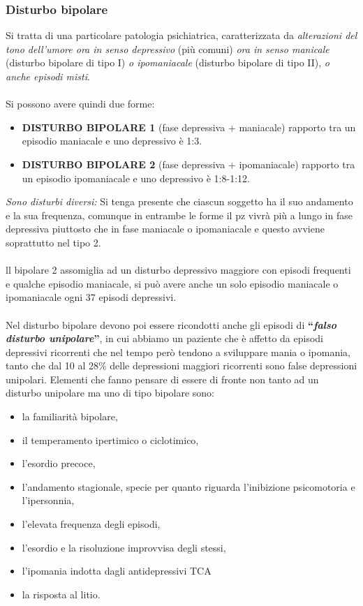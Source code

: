 \subsubsection{Disturbo bipolare}

Si tratta di una particolare patologia psichiatrica, caratterizzata da
\emph{alterazioni del tono dell'umore ora in senso depressivo} (più
comuni) \emph{ora in senso manicale} (disturbo bipolare di tipo I)
\emph{o ipomaniacale} (disturbo bipolare di tipo II), \emph{o anche
episodi misti}.
\\\\
Si possono avere quindi due forme:

\begin{itemize}
\item
  \textbf{DISTURBO BIPOLARE 1} (fase depressiva + maniacale) rapporto
  tra un episodio maniacale e uno depressivo è 1:3.
\item
  \textbf{DISTURBO BIPOLARE 2} (fase depressiva + ipomaniacale) rapporto
  tra un episodio ipomaniacale e uno depressivo è 1:8-1:12.
\end{itemize}

\emph{Sono disturbi diversi:} Si tenga presente che ciascun soggetto ha
il suo andamento e la sua frequenza, comunque in entrambe le forme il pz
vivrà più a lungo in fase depressiva piuttosto che in fase maniacale o
ipomaniacale e questo avviene soprattutto nel tipo 2.
\\\\
ll bipolare 2 assomiglia ad un disturbo depressivo maggiore con episodi
frequenti e qualche episodio maniacale, si può avere anche un solo
episodio maniacale o ipomaniacale ogni 37 episodi depressivi.
\\\\
Nel disturbo bipolare devono poi essere ricondotti anche gli episodi di
\textbf{``\emph{falso disturbo unipolare}''}, in cui abbiamo un paziente
che è affetto da episodi depressivi ricorrenti che nel tempo però
tendono a sviluppare mania o ipomania, tanto che dal 10 al 28\% delle
depressioni maggiori ricorrenti sono false depressioni unipolari.
Elementi che fanno pensare di essere di fronte non tanto ad un disturbo
unipolare ma uno di tipo bipolare sono:

\begin{itemize}
\item
  la familiarità bipolare,
\item
  il temperamento ipertimico o ciclotimico,
\item
  l'esordio precoce,
\item
  l'andamento stagionale, specie per quanto riguarda l'inibizione
  psicomotoria e l'ipersonnia,
\item
  l'elevata frequenza degli episodi,
\item
  l'esordio e la risoluzione improvvisa degli stessi,
\item
  l'ipomania indotta dagli antidepressivi TCA
\item
  la risposta al litio.
\end{itemize}

